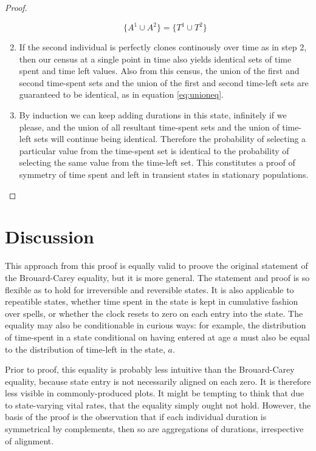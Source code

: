 \documentclass[12pt,oneside,a4paper]{article} %
\theoremstyle{definition}
\begin{document}
\begin{proof}
\begin{enumerate}
\begin{equation}
\label{eq:unioneq}
\{A^1 \cup A^2\} = \{T^1 \cup T^2\}
\end{equation}

\item{} If the second individual is perfectly clones continously over time as in
step 2, then our census at a single point in time also yields
identical sets of time spent and time left values. Also from this census, the union of the
first and second time-spent sets and the union of the first and second time-left sets
are guaranteed to be identical, as in equation \eqref{eq:unioneq}. 

\item{} By induction we can keep adding durations in this state, infinitely if we
please, and the union of all resultant time-spent sets and the union of time-left sets will continue being identical. Therefore the
probability of selecting a particular value from the time-spent set is identical
to the probability of selecting the same value from the time-left set. This
constitutes a proof of symmetry of time spent and left in transient states in
stationary populations.
\end{enumerate}
\end{proof}

\section{Discussion}
This approach from this proof is equally valid to proove the
original statement of the Brouard-Carey equality, but it is more general. The
statement and proof is so flexible as to hold for irreversible and reversible
states. It is also applicable to repeatible states, whether time spent in the
state is kept in cumulative fashion over spells, or whether the clock resets to
zero on each entry into the state. The equality may also be conditionable in
curious ways: for example, the distribution of time-spent in a state conditional
on having entered at age $a$ must also be equal to the distribution of time-left in
the state, $a$.

Prior to proof, this equality is probably less intuitive than the Brouard-Carey
equality, because state entry is not necessarily aligned on each zero. It is
therefore less visible in commonly-produced plots. It might be tempting to think
that due to state-varying vital rates, that the equality simply ought not hold.
However, the basis of the proof is the observation that if each individual
duration is symmetrical by complements, then so are aggregations of
durations, irrespective of alignment. 
\end{document}
